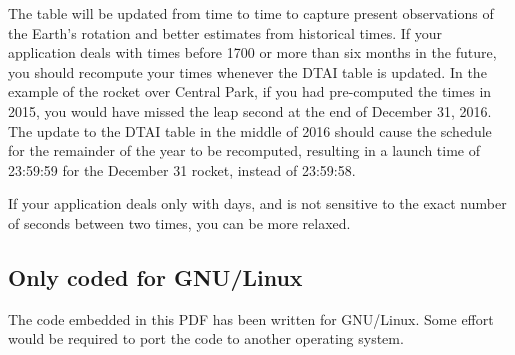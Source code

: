 \documentclass[letterpaper,twoside]{article}
\begin{document}
The table will be updated from time to time to capture present
observations of the Earth's rotation and better estimates from
historical times.  If your application deals with times before
1700 or more than six months in the future, you should recompute
your times whenever the DTAI table is updated.  In the example
of the rocket over Central Park, if you had pre-computed the times
in 2015, you would have missed the leap second at the end of
December 31, 2016.  The update to the DTAI table in the middle
of 2016 should cause the schedule for the remainder of the year
to be recomputed, resulting in a launch time of 23:59:59 for
the December 31 rocket, instead of 23:59:58.

If your application deals only with days, and is not sensitive
to the exact number of seconds between two times, you can be
more relaxed.

\subsection{Only coded for GNU/Linux}
The code embedded in this PDF has been written for GNU/Linux.
Some effort would be required to port the code to another
operating system.
\end{document}
